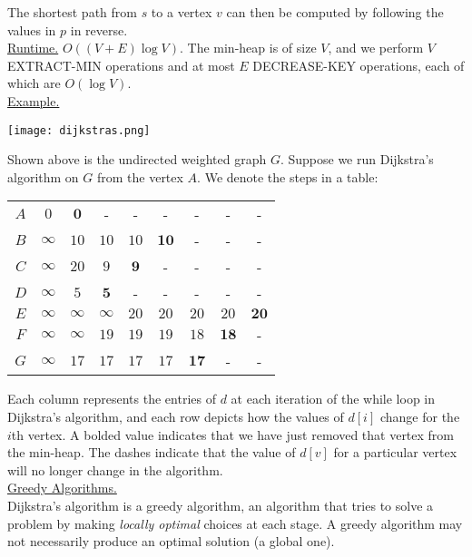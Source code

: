 \documentclass[12pt, fleqn]{general}
\begin{document}
\begin{multicols*}{2}
    The shortest path from $s$ to a vertex $v$ can then be computed by following the values in $p$ in reverse.\\

    \underline{Runtime.} $O((V+E)\log V)$. The min-heap is of size $V$, and we perform $V$ EXTRACT-MIN operations and at most $E$ DECREASE-KEY operations, each of which are $O(\log V)$.\\

    \underline{Example.}

    \begin{center}
    \texttt{[image: dijkstras.png]}\\
    \end{center}

    Shown above is the undirected weighted graph $G$. Suppose we run Dijkstra's algorithm on $G$ from the vertex $A$. We denote the steps in a table:

    \begin{center}
    \begin{tabular}{|c|c c c c c c c c|}\hline
    $A$&$0$&$\mathbf{0}$&-&-&-&-&-&-\\
    $B$&$\infty$&$10$&$10$&$10$&$\mathbf{10}$&-&-&-\\
    $C$&$\infty$&$20$&$9$&$\mathbf{9}$&-&-&-&-\\
    $D$&$\infty$&$5$&$\mathbf{5}$&-&-&-&-&-\\
    $E$&$\infty$&$\infty$&$\infty$&$20$&$20$&$20$&$20$&$\mathbf{20}$\\
    $F$&$\infty$&$\infty$&$19$&$19$&$19$&$18$&$\mathbf{18}$&-\\
    $G$&$\infty$&$17$&$17$&$17$&$17$&$\mathbf{17}$&-&-\\\hline
    \end{tabular}
    \end{center}

    Each column represents the entries of $d$ at each iteration of the while loop in Dijkstra's algorithm, and each row depicts how the values of $d[i]$ change for the $i$th vertex. A bolded value indicates that we have just removed that vertex from the min-heap. The dashes indicate that the value of $d[v]$ for a particular vertex will no longer change in the algorithm.\\

    \underline{Greedy Algorithms.}\\
    
    Dijkstra's algorithm is a greedy algorithm, an algorithm that tries to solve a problem by making \emph{locally optimal} choices at each stage. A greedy algorithm may not necessarily produce an optimal solution (a global one).\\


\end{multicols*}
\end{document}
